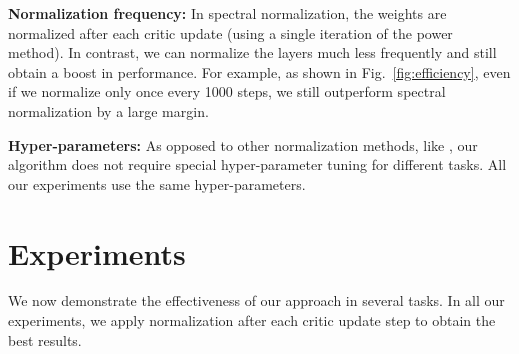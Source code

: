 \documentclass[letterpaper]{article} %
\begin{document}
	\noindent\textbf{Normalization frequency:} In spectral normalization, the weights are normalized after each critic update (using a single iteration of the power method). In contrast, we can normalize the layers much less frequently and still obtain a boost in performance. For example, as shown in Fig.~\ref{fig:efficiency}, even if we normalize only once every 1000 steps, we still outperform spectral normalization by a large margin.

	\noindent\textbf{Hyper-parameters:} As opposed to other normalization methods, like \cite{arjovsky2017towards,gulrajani2017improved,ioffe2015batch,salimans2016weight,brock2016neural,spectral}, our algorithm does not require special hyper-parameter tuning for different tasks. All our experiments use the same hyper-parameters.


\section{Experiments}
We now demonstrate the effectiveness of our approach in several  tasks. In all our experiments, we apply normalization after each critic update step to obtain the best results.
\end{document}
